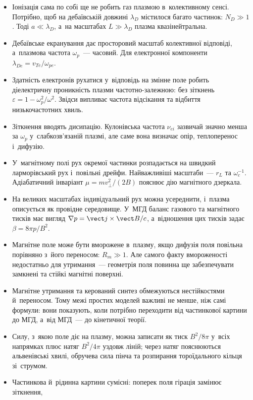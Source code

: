 \begin{itemize}
	\item Іонізація сама по собі ще не робить газ плазмою в~колективному сенсі. Потрібно,
	  щоб на дебаївській довжині $\lambda_D$ містилося багато частинок: $N_D\gg1$. Тоді
	  $a\ll\lambda_D$, а~на масштабах $L\gg\lambda_D$ плазма квазінейтральна.
	\item Дебаївське екранування дає просторовий масштаб колективної відповіді, а~плазмова
	  частота $\omega_p$~--- часовий. Для електронної компоненти
	  $\lambda_{De}=v_{Te}/\omega_{pe}$.
	\item Здатність електронів рухатися у~відповідь на змінне поле робить діелектричну
	  проникність плазми частотно-залежною: без зіткнень
	  $\varepsilon=1-\omega_p^2/\omega^2$. Звідси випливає частота відсікання та відбиття
	  низькочастотних хвиль.
	\item Зіткнення вводять дисипацію. Кулонівська частота $\nu_{ei}$ зазвичай значно
	  менша за $\omega_p$ у~слабкозв'язаній плазмі, але саме вона визначає опір,
	  теплоперенос і~дифузію.
	\item У~магнітному полі рух окремої частинки розпадається на швидкий ларморівський рух
	  і~повільні дрейфи. Найважливіші масштаби~--- $r_L$ та $\omega_c^{-1}$. Адіабатичний
	  інваріант $\mu=mv_\perp^2/(2B)$ пояснює дію магнітного дзеркала.
	\item На великих масштабах індивідуальний рух можна усереднити, і~плазма описується як
	  провідне середовище. У~МГД баланс газового та магнітного тисків має вигляд $\nabla
	  p=\vect j\times\vect B/c$, а~відношення цих тисків задає $\beta=8\pi p/B^2$.
	\item Магнітне поле може бути вморожене в~плазму, якщо дифузія поля повільна порівняно
	  з~його переносом: $R_m\gg1$. Але самого факту вмороженості недостатньо для
	  утримання~--- геометрія поля повинна ще забезпечувати замкнені та стійкі магнітні
	  поверхні.
	\item Магнітне утримання та керований синтез обмежуються нестійкостями й~переносом.
	  Тому межі простих моделей важливі не менше, ніж самі формули: вони показують, коли
	  потрібно переходити від частинкової картини до МГД, а~від МГД~--- до кінетичної
	  теорії.
	  	\item Силу, з~якою поле діє на плазму, можна записати як тиск $B^2/8\pi$ у~всіх
	  	  напрямках плюс натяг $B^2/4\pi$ уздовж ліній; через натяг пояснюються
	  	  альвенівські хвилі, обручева сила пінча та розпирання тороїдального кільця
	  	  зі~струмом.
	\item Частинкова й~рідинна картини сумісні: поперек поля гірація замінює зіткнення,

\end{itemize}
